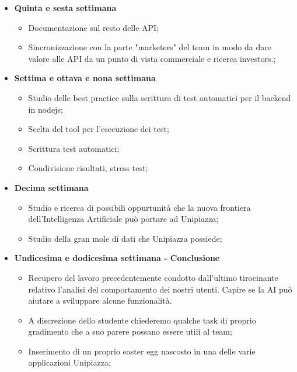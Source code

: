 {\begin{itemize}
\begin{itemize}
        \end{itemize}
        \item \textbf{Quinta e sesta settimana} 
        \begin{itemize}
            \item Documentazione sul resto delle API;
            \item Sincronizzazione con la parte "marketers" del team in modo da dare valore alle API da un punto di vista commerciale e ricerca investors.;
        \end{itemize}
        \item \textbf{Settima e ottava e nona settimana} 
        \begin{itemize}
            \item Studio delle best practice sulla scrittura di test automatici per il backend in nodejs;
            \item Scelta del tool per l'esecuzione dei test;
            \item Scrittura test automatici;
            \item Condivisione risultati, stress test;
        \end{itemize}
        \item \textbf{Decima settimana} 
        \begin{itemize}
            \item Studio e ricerca di possibili oppurtunità che la nuova frontiera dell'Intelligenza Artificiale può portare ad Unipiazza;
            \item Studio della gran mole di dati che Unipiazza possiede;
        \end{itemize}
        \item \textbf{Undicesima e dodicesima settimana - Conclusione} 
        \begin{itemize}
            \item Recupero del lavoro precedentemente condotto dall'ultimo tirocinante relativo l'analisi del comportamento dei nostri utenti. Capire se la AI può aiutare a sviluppare alcune funzionalità.
            \item A discrezione dello studente chiederemo qualche task di proprio gradimento che a suo parere possano essere utili al team;
            \item Inserimento di un proprio easter egg nascosto in una delle varie applicazioni Unipiazza;
        \end{itemize}
    \end{itemize}
}

